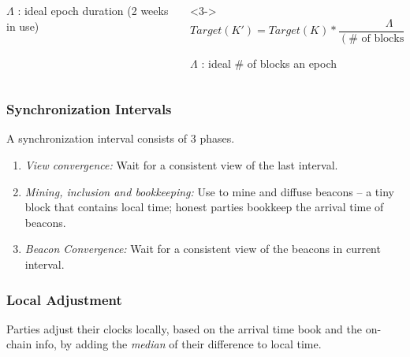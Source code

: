 \begin{frame}
\begin{columns}[c, onlytextwidth]
\begin{column}{0.45\textwidth}
            $\varLambda$ : ideal epoch duration (2 weeks in use)
        \end{column}

        \begin{column}{0.45\textwidth}<3-> \centering
            \[ Target(K') = Target(K) * \frac{\varLambda}{(\# \text{ of blocks in } K)}. \]

            $\varLambda$ : ideal \# of blocks an epoch
        \end{column}
    \end{columns}

    \vspace{1em}

\end{frame}

\begin{frame}
    \frametitle{Synchronization Intervals}

    A synchronization interval consists of 3 phases.

    \centering 

    \begin{enumerate}
        \item<2-> \emph{View convergence:} Wait for a consistent view of the last interval.
        \item<3-> \emph{Mining, inclusion and bookkeeping:} Use  to mine and diffuse beacons -- a tiny block that contains local time; honest parties bookkeep the arrival time of beacons.
        \item<4-> \emph{Beacon Convergence:} Wait for a consistent view of the beacons in current interval.
    \end{enumerate}
\end{frame}

\begin{frame}
    \frametitle{Local Adjustment} 

    Parties adjust their clocks locally, based on the arrival time book and the on-chain info, by adding the \emph{median} of their difference to local time.

\end{frame}
